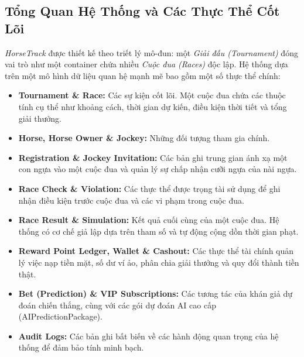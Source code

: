 \documentclass{llncs}
\begin{document}
\subsection{Tổng Quan Hệ Thống và Các Thực Thể Cốt Lõi}
\textit{HorseTrack} được thiết kế theo triết lý mô-đun: một \textit{Giải đấu (Tournament)} đóng vai trò như một container chứa nhiều \textit{Cuộc đua (Races)} độc lập. Hệ thống dựa trên một mô hình dữ liệu quan hệ mạnh mẽ bao gồm một số thực thể chính:
\begin{itemize}
    \item \textbf{Tournament \& Race:} Các sự kiện cốt lõi. Một cuộc đua chứa các thuộc tính cụ thể như khoảng cách, thời gian dự kiến, điều kiện thời tiết và tổng giải thưởng.
    \item \textbf{Horse, Horse Owner \& Jockey:} Những đối tượng tham gia chính. 
    \item \textbf{Registration \& Jockey Invitation:} Các bản ghi trung gian ánh xạ một con ngựa vào một cuộc đua và quản lý sự chấp nhận cưỡi ngựa của nài ngựa.
    \item \textbf{Race Check \& Violation:} Các thực thể được trọng tài sử dụng để ghi nhận điều kiện trước cuộc đua và các vi phạm trong cuộc đua.
    \item \textbf{Race Result \& Simulation:} Kết quả cuối cùng của một cuộc đua. Hệ thống có cơ chế giả lập dựa trên tham số và tự động cộng dồn thời gian phạt.
    \item \textbf{Reward Point Ledger, Wallet \& Cashout:} Các thực thể tài chính quản lý việc nạp tiền mặt, số dư ví ảo, phân chia giải thưởng và quy đổi thành tiền thật.
    \item \textbf{Bet (Prediction) \& VIP Subscriptions:} Các tương tác của khán giả dự đoán chiến thắng, cùng với các gói dự đoán AI cao cấp (AIPredictionPackage).
    \item \textbf{Audit Logs:} Các bản ghi bất biến về các hành động quan trọng của hệ thống để đảm bảo tính minh bạch.
\end{itemize}
\end{document}
